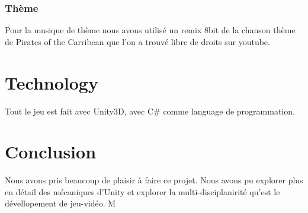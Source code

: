 \documentclass{prologArticle}
\begin{document}
\subsubsection{Thème}
Pour la musique de thème nous avons utilisé un remix 8bit de la chanson thème de Pirates of the Carribean que l'on a trouvé libre de droits sur youtube.


\section{Technology}
Tout le jeu est fait avec Unity3D, avec C\# comme language de programmation.


\section{Conclusion}
Nous avons pris beaucoup de plaisir à faire ce projet. Nous avons pu explorer plus en détail des mécaniques d'Unity et explorer la multi-disciplanirité qu'est le dévellopement de jeu-vidéo. M
\end{document}
